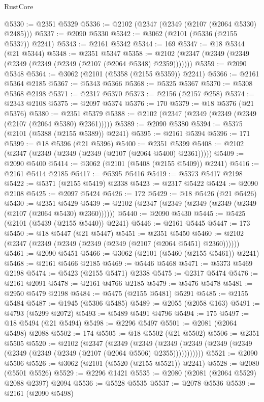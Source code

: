 \begin{lexlean}{RustCore}
\begin{coremodule}
@5330 := @2351 @5329
@5336 := @2102 (@2347 (@2349 (@2107 (@2064 @5330) @2485)))
@5337 := @2090 @5330
@5342 := @3062 (@2101 (@5336 (@2155 @5337)) @2241)
@5343 := @2161 @5342
@5344 := 169
@5347 := @18 @5344 (@21 @5344)
@5348 := @2351 @5347
@5358 := @2102 (@2347 (@2349 (@2349 (@2349 (@2349 (@2349 (@2107 (@2064 @5348) @2359)))))))
@5359 := @2090 @5348
@5364 := @3062 (@2101 (@5358 (@2155 @5359)) @2241)
@5366 := @2161 @5364 @2185
@5367 := @5343 @5366
@5368 := @5325 @5367
@5370 := @5308 @5368 @2198
@5371 := @2317 @5370
@5373 := @2156 (@2157 @258)
@5374 := @2343 @2108
@5375 := @2097 @5374
@5376 := 170
@5379 := @18 @5376 (@21 @5376)
@5380 := @2351 @5379
@5388 := @2102 (@2347 (@2349 (@2349 (@2349 (@2107 (@2064 @5380) @2361)))))
@5389 := @2090 @5380
@5394 := @5375 (@2101 (@5388 (@2155 @5389)) @2241)
@5395 := @2161 @5394
@5396 := 171
@5399 := @18 @5396 (@21 @5396)
@5400 := @2351 @5399
@5408 := @2102 (@2347 (@2349 (@2349 (@2349 (@2107 (@2064 @5400) @2361)))))
@5409 := @2090 @5400
@5414 := @3062 (@2101 (@5408 (@2155 @5409)) @2241)
@5416 := @2161 @5414 @2185
@5417 := @5395 @5416
@5419 := @5373 @5417 @2198
@5422 := @5371 (@2155 @5419) @2338
@5423 := @2317 @5422
@5424 := @2090 @2108
@5425 := @2097 @5424
@5426 := 172
@5429 := @18 @5426 (@21 @5426)
@5430 := @2351 @5429
@5439 := @2102 (@2347 (@2349 (@2349 (@2349 (@2349 (@2107 (@2064 @5430) @2360))))))
@5440 := @2090 @5430
@5445 := @5425 (@2101 (@5439 (@2155 @5440)) @2241)
@5446 := @2161 @5445
@5447 := 173
@5450 := @18 @5447 (@21 @5447)
@5451 := @2351 @5450
@5460 := @2102 (@2347 (@2349 (@2349 (@2349 (@2349 (@2107 (@2064 @5451) @2360))))))
@5461 := @2090 @5451
@5466 := @3062 (@2101 (@5460 (@2155 @5461)) @2241)
@5468 := @2161 @5466 @2185
@5469 := @5446 @5468
@5471 := @5373 @5469 @2198
@5474 := @5423 (@2155 @5471) @2338
@5475 := @2317 @5474
@5476 := @2161 @2091
@5478 := @2161 @4766 @2185
@5479 := @5476 @5478
@5481 := @2950 @5479 @2198
@5484 := @5475 (@2155 @5481) @5291
@5485 := @2155 @5484
@5487 := @1945 (@5306 @5485)
@5489 := @2055 (@2058 @163)
@5491 := @4793 (@5299 @2072)
@5493 := @5489 @5491 @4796
@5494 := 175
@5497 := @18 @5494 (@21 @5494)
@5498 := @2296 @5497
@5501 := @2081 (@2064 @5498) @2088
@5502 := 174
@5505 := @18 @5502 (@21 @5502)
@5506 := @2351 @5505
@5520 := @2102
    (@2347
      (@2349
        (@2349
          (@2349 (@2349 (@2349 (@2349 (@2349 (@2349 (@2349 (@2107 (@2064 @5506) @2355)))))))))))
@5521 := @2090 @5506
@5526 := @3062 (@2101 (@5520 (@2155 @5521)) @2241)
@5528 := @2080 (@5501 @5526)
@5529 := @2296 @1421
@5535 := @2080 (@2081 (@2064 @5529) @2088 @2397) @2094
@5536 := @5528 @5535
@5537 := @2078 @5536
@5539 := @2161 (@2090 @5498)

\end{coremodule}
\end{lexlean}
